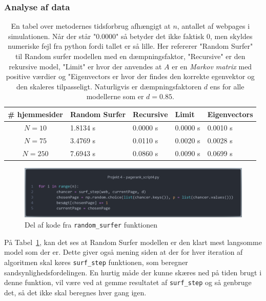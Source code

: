 \subsubsection*{Analyse af data}
\begin{table}[!h]
    \centering
    \begin{tabular}{c|l|l|l|l}
        \# hjemmesider & Random Surfer & Recursive & Limit & Eigenvectors \\
        \hline
        $N = 10$       & 1.8134 s   & 0.0000 s   & 0.0000 s   & 0.0010 s   \\
        $N = 75$       & 3.4769 s   & 0.0110 s   & 0.0020 s   & 0.0028 s   \\
        $N = 250$      & 7.6943 s   & 0.0860 s   & 0.0090 s   & 0.0699 s
    \end{tabular}
    \caption{En tabel over metodernes tidsforbrug afhængigt at $n$, antallet af webpages i simulationen. Når der står "0.0000" så betyder det ikke faktisk 0, men skyldes numeriske fejl fra python fordi tallet er så lille. Her refererer "Random Surfer" til Random surfer modellen med en dæmpningsfaktor, "Recursive" er den rekursive model, "Limit" er hvor der anvendes at $A$ er en \textit{Markov matrix} med positive værdier og "Eigenvectors er hvor der findes den korrekte egenvektor og den skaleres tilpasseligt. Naturligvis er dæmpningsfaktoren $d$ ens for alle modellerne som er $d = 0.85$.}
    \label{tidsFigur}
\end{table}

\begin{figure}
    \centering
    \includegraphics[width = \linewidth]{Kode1.png}
    \caption{Del af kode fra \texttt{random\_surfer} funktionen}
\end{figure}


På Tabel~\ref{tidsFigur}, kan det ses at Random Surfer modellen er den klart mest langsomme model som der er. Dette giver også mening siden at der for hver iteration af algoritmen skal køres \texttt{surf\_step} funktionen, som beregner sandsynlighedsfordelingen. En hurtig måde der kunne skæres ned på tiden brugt i denne funktion, vil være ved at gemme resultatet af \texttt{surf\_step} og så genbruge det, så det ikke skal beregnes hver gang igen.

